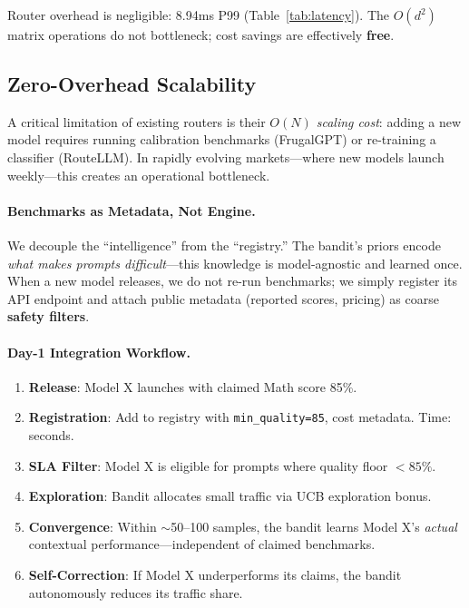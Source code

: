 Router overhead is negligible: 8.94ms P99 (Table~\ref{tab:latency}). The $O(d^2)$ matrix operations do not bottleneck; cost savings are effectively \textbf{free}.

\subsection{Zero-Overhead Scalability}
\label{sec:scalability}

A critical limitation of existing routers is their \emph{$O(N)$ scaling cost}: adding a new model requires running calibration benchmarks (FrugalGPT) or re-training a classifier (RouteLLM). In rapidly evolving markets---where new models launch weekly---this creates an operational bottleneck.

\paragraph{Benchmarks as Metadata, Not Engine.} We decouple the ``intelligence'' from the ``registry.'' The bandit's priors encode \emph{what makes prompts difficult}---this knowledge is model-agnostic and learned once. When a new model releases, we do not re-run benchmarks; we simply register its API endpoint and attach public metadata (reported scores, pricing) as coarse \textbf{safety filters}.

\paragraph{Day-1 Integration Workflow.}
\begin{enumerate}[leftmargin=*,nosep]
    \item \textbf{Release}: Model X launches with claimed Math score 85\%.
    \item \textbf{Registration}: Add to registry with \texttt{min\_quality=85}, cost metadata. Time: seconds.
    \item \textbf{SLA Filter}: Model X is eligible for prompts where quality floor $<85\%$.
    \item \textbf{Exploration}: Bandit allocates small traffic via UCB exploration bonus.
    \item \textbf{Convergence}: Within $\sim$50--100 samples, the bandit learns Model X's \emph{actual} contextual performance---independent of claimed benchmarks.
    \item \textbf{Self-Correction}: If Model X underperforms its claims, the bandit autonomously reduces its traffic share.
\end{enumerate}


